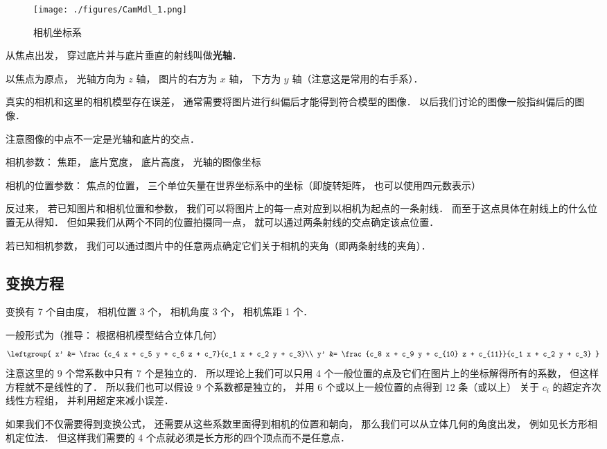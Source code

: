 
\begin{figure}[ht]
\centering
\texttt{[image: ./figures/CamMdl\_1.png]}
\caption{相机坐标系} \label{CamMdl_fig1}
\end{figure}

从焦点出发， 穿过底片并与底片垂直的射线叫做\textbf{光轴}．

以焦点为原点， 光轴方向为 $z$ 轴， 图片的右方为 $x$ 轴， 下方为 $y$ 轴（注意这是常用的右手系）．

真实的相机和这里的相机模型存在误差， 通常需要将图片进行纠偏后才能得到符合模型的图像． 以后我们讨论的图像一般指纠偏后的图像．

注意图像的中点不一定是光轴和底片的交点．

相机参数： 焦距， 底片宽度， 底片高度， 光轴的图像坐标

相机的位置参数： 焦点的位置， 三个单位矢量在世界坐标系中的坐标（即旋转矩阵， 也可以使用四元数表示）

反过来， 若已知图片和相机位置和参数， 我们可以将图片上的每一点对应到以相机为起点的一条射线． 而至于这点具体在射线上的什么位置无从得知． 但如果我们从两个不同的位置拍摄同一点， 就可以通过两条射线的交点确定该点位置．

若已知相机参数， 我们可以通过图片中的任意两点确定它们关于相机的夹角（即两条射线的夹角）．

\subsection{变换方程}
变换有 7 个自由度， 相机位置 3 个， 相机角度 3 个， 相机焦距 1 个．

一般形式为（推导： 根据相机模型结合立体几何）
\begin{equation}\label{CamMdl_eq1}
\leftgroup{
x' &= \frac{c_4 x + c_5 y + c_6 z + c_7}{c_1 x + c_2 y + c_3}\\
y' &= \frac{c_8 x + c_9 y + c_{10} z + c_{11}}{c_1 x + c_2 y + c_3}
}
\end{equation}
注意这里的 9 个常系数中只有 7 个是独立的． 所以理论上我们可以只用 4 个一般位置的点及它们在图片上的坐标解得所有的系数， 但这样方程就不是线性的了． 所以我们也可以假设 9 个系数都是独立的， 并用 6 个或以上一般位置的点得到 12 条（或以上） 关于 $c_i$ 的超定齐次线性方程组， 并利用超定来减小误差．

如果我们不仅需要得到变换公式， 还需要从这些系数里面得到相机的位置和朝向， 那么我们可以从立体几何的角度出发， 例如见长方形相机定位法． 但这样我们需要的 4 个点就必须是长方形的四个顶点而不是任意点．

